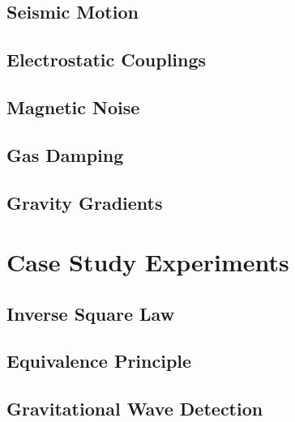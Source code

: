 \documentclass{article}
\begin{document}
\subsection{Seismic Motion}
\subsection{Electrostatic Couplings}
\subsection{Magnetic Noise}
\subsection{Gas Damping}
\subsection{Gravity Gradients}

\section{Case Study Experiments}
\subsection{Inverse Square Law}
\subsection{Equivalence Principle}
\subsection{Gravitational Wave Detection}
\end{document}
